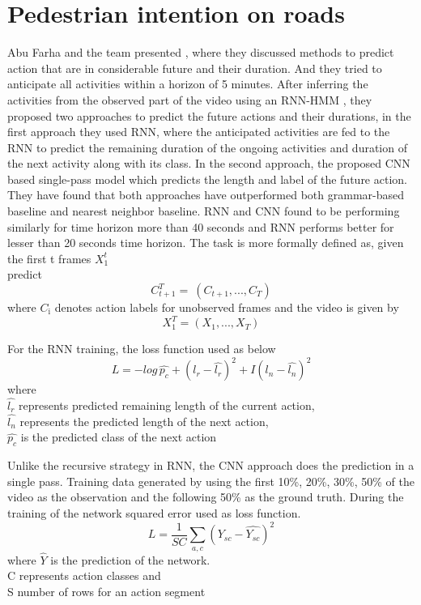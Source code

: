 \section{Pedestrian intention on roads}
\newpara Abu Farha and the team presented \cite{abu2018will}, where they discussed methods to predict action that are in considerable future and their duration. And they tried to anticipate all activities within a horizon of 5 minutes. After inferring the activities from the observed part of the video using an RNN-HMM \cite{richard2017weakly}, they proposed two approaches to predict the future actions and their durations, in the first approach they used RNN, where the anticipated activities are fed to the RNN to predict the remaining duration of the ongoing activities and duration of the next activity along with its class.
In the second approach, the proposed CNN based single-pass model which predicts the length and label of the future action. They have found that both approaches have outperformed both grammar-based baseline and nearest neighbor baseline. RNN and CNN found to be performing similarly for time horizon more than 40 seconds and RNN performs better for lesser than 20 seconds time horizon. The task is more formally defined as,
given the first t frames $X_{\text{1}}^t$ \\
predict \[ C_{t+1}^T  = \ (C_{t+1}, ..., C_{T}) \]
where $C_{\text{i}}$ denotes action labels for unobserved frames
and the video is given by
\[ X_{1}^T = (X_{1}, ..., X_{T}) \]

\newpara
For the RNN training, the loss function used as below
\begin{equation}
    L = -log\, \hat{p_c} + (l_r - \hat{l_r})^2 +  I (l_n - \hat{l_n})^2 
\end{equation}
where \\
$\hat{l_r}$ represents predicted remaining length of the current action, \\
$\hat{l_n}$ represents the predicted length of the next action, \\
$\hat{p_c}$ is the predicted class of the next action

\newpara Unlike the recursive strategy in RNN, the CNN approach does the prediction in a single pass.
Training data generated by using the first 10\%, 20\%, 30\%, 50\% of the video as the observation and the following 50\% as the ground truth. During the training of the network squared error used as loss function.
\begin{equation}
    L = \frac{1} {SC} \sum_{a,c} (Y_{sc} - \hat{Y_{sc}})^2 
\end{equation}
where $\hat{Y}$ is the prediction of the network. \\
C represents action classes and \\
S number of rows for an action segment

